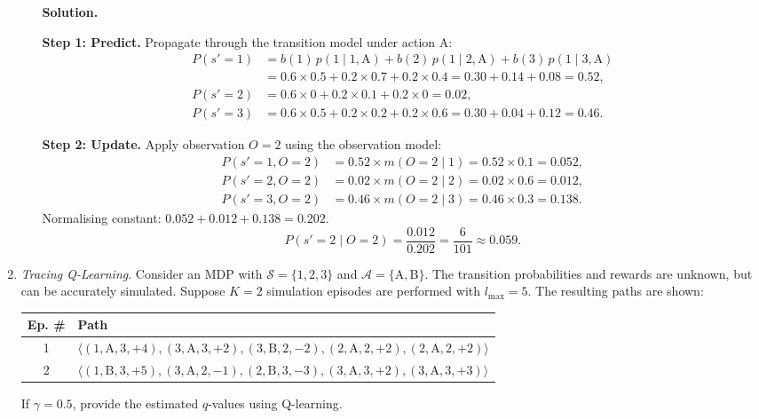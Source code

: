 \documentclass[12pt]{article}
\newenvironment{solution}{%
  \ifshowsolutions\begin{solutionbox}\noindent\textbf{\color{blue!70!black}Solution.}\quad\fi
  \ifshowsolutions\else\expandafter\comment\fi
}{%
  \ifshowsolutions\end{solutionbox}\fi
  \ifshowsolutions\else\expandafter\endcomment\fi
}
\begin{document}
\begin{enumerate}
\begin{enumerate}
\begin{solution}
    \textbf{Step 1: Predict.} Propagate through the transition model under action $\mathrm{A}$:
    \begin{align*}
      P(s'=1) &= b(1)\,p(1\mid 1,\mathrm{A}) + b(2)\,p(1\mid 2,\mathrm{A}) + b(3)\,p(1\mid 3,\mathrm{A})\\
              &= 0.6\times 0.5 + 0.2\times 0.7 + 0.2\times 0.4 = 0.30+0.14+0.08 = 0.52,\\
      P(s'=2) &= 0.6\times 0 + 0.2\times 0.1 + 0.2\times 0 = 0.02,\\
      P(s'=3) &= 0.6\times 0.5 + 0.2\times 0.2 + 0.2\times 0.6 = 0.30+0.04+0.12 = 0.46.
    \end{align*}

    \textbf{Step 2: Update.} Apply observation $O=2$ using the observation model:
    \begin{align*}
      P(s'=1,O=2) &= 0.52\times m(O=2\mid 1) = 0.52\times 0.1 = 0.052,\\
      P(s'=2,O=2) &= 0.02\times m(O=2\mid 2) = 0.02\times 0.6 = 0.012,\\
      P(s'=3,O=2) &= 0.46\times m(O=2\mid 3) = 0.46\times 0.3 = 0.138.
    \end{align*}
    Normalising constant: $0.052 + 0.012 + 0.138 = 0.202$.
    \[
      P(s'=2 \mid O=2) = \frac{0.012}{0.202} = \frac{6}{101} \approx 0.059.
    \]
  \end{solution}
  \end{enumerate}
    \item \textit{Tracing Q-Learning}. Consider an MDP with $\mathcal{S} = \lbrace 1, 2, 3 \rbrace$ and $\mathcal{A} = \lbrace \text{A}, \text{B} \rbrace$. The transition probabilities and rewards are unknown, but can be accurately simulated. Suppose $K = 2$ simulation episodes are performed with $l_{\text{max}} = 5$. The resulting paths are shown:
        \begin{table}[H]
            \centering
            \begin{tabular}{|c|l|}
                \hline
                 Ep. \# & Path  \\\hline
                 1 & $\langle (1,\text{A},3, +4),  (3,\text{A},3, +2),  (3,\text{B},2, -2), (2, \text{A}, 2, +2), (2,\text{A},2,+2)\rangle$ \\\hline
                 2 & $\langle (1,\text{B},3,+5),  (3,\text{A},2,-1),  (2,\text{B},3,-3), (3,\text{A},3,+2),(3,\text{A},3,+3)\rangle$ \\\hline
            \end{tabular}
        \end{table}
        If $\gamma = 0.5$, provide the estimated $q$-values using Q-learning.


\end{enumerate}
\end{document}
